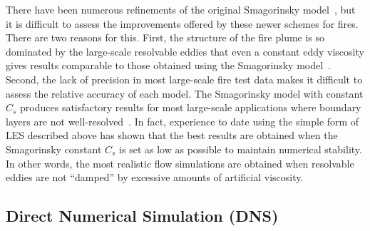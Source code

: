 \documentclass[11pt]{book}
\begin{document}
There have been numerous refinements of the original Smagorinsky
model~\cite{Deardorff:1,Germano:1,Lilly:1},
but it is difficult to assess the improvements offered by these newer
schemes for fires. There are two reasons for this. First, the structure of the
fire plume is so dominated by the large-scale resolvable eddies that
even a constant eddy viscosity gives results comparable to
those obtained using the Smagorinsky model~\cite{Baum:4}. Second, the lack
of precision in most large-scale fire test data makes it difficult to
assess the relative accuracy of each model.
The Smagorinsky model with constant $C_s$ produces satisfactory results
for most large-scale applications where boundary layers are not
well-resolved~\cite{FDS_VV_Guide_5}. In fact, experience to date using the simple form of LES described above
has shown that the best results are obtained when the Smagorinsky constant $C_s$ is set
as low as possible to maintain numerical stability. In other words, the most realistic
flow simulations are obtained when resolvable eddies are not ``damped'' by excessive
amounts of artificial viscosity.



\subsection{Direct Numerical Simulation (DNS)}
\label{DNS}
\end{document}

